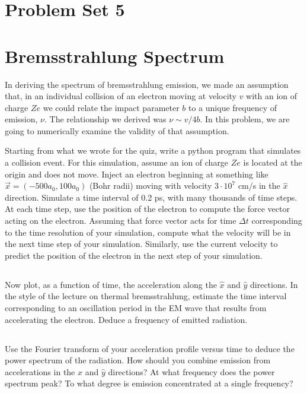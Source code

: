 \documentclass[11pt]{article}
\begin{document}
\pagestyle{empty}

\section*{\centering Problem Set 5}

\section{Bremsstrahlung Spectrum}

In deriving the spectrum of bremsstrahlung emission, we made an assumption that, in an
individual collision of an electron moving at velocity $v$ with an ion of charge $Ze$
we could relate the impact parameter $b$ to a unique frequency of emission, $\nu$.  The
relationship we derived was $\nu\sim v/4b$.
In this problem, we are going to numerically examine the validity of that assumption.

Starting from what we wrote for the quiz, write a python program that simulates a collision event.  For this simulation,
assume an ion of charge $Ze$ is located at the origin and does not move.  Inject an
electron beginning at something like $\vec x=(-500a_0,100a_0)$ (Bohr radii) moving with velocity
$3\cdot10^7$ cm/s in the $\hat x$ direction.  Simulate a time interval of 0.2 ps, with many thousands
of time steps.  At each time step, use the position of the electron to compute the force
vector acting on the electron.  Assuming that force vector acts for time $\Delta t$ corresponding
to the time resolution of your simulation, compute what the velocity will be in the next time step of
your simulation.  Similarly, use the current velocity to predict the position of the electron in the
next step of your simulation.

\subsection{}

Now plot, as a function of time, the acceleration along the $\hat x$ and $\hat y$ directions.  In the style of
the lecture on thermal bremsstrahlung, estimate the time interval corresponding to an oscillation period in the
EM wave that results from accelerating the electron.  Deduce a frequency of emitted radiation.

\subsection{}
Use the Fourier transform of your acceleration profile versus time to deduce the power spectrum of the radiation.  How
should you combine emission from accelerations in the $\hat x$ and $\hat y$ directions?  At
what frequency does the power spectrum peak?  To what degree is emission concentrated at a single frequency?
\end{document}
